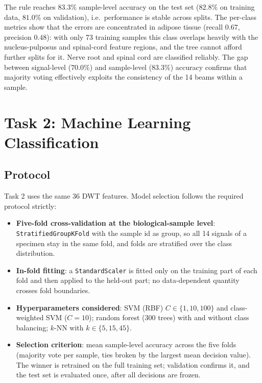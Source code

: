 \documentclass[11pt]{article}
\begin{document}
The rule reaches $83.3\%$ sample-level accuracy on the test set ($82.8\%$ on
training data, $81.0\%$ on validation), i.e.\ performance is stable across
splits. The per-class metrics show that the errors are concentrated in adipose
tissue (recall $0.67$, precision $0.48$): with only 73 training samples this
class overlaps heavily with the nucleus-pulposus and spinal-cord feature
regions, and the tree cannot afford further splits for it. Nerve root and
spinal cord are classified reliably. The gap between signal-level
($70.0\%$) and sample-level ($83.3\%$) accuracy confirms that majority voting
effectively exploits the consistency of the 14 beams within a sample.

\section{Task 2: Machine Learning Classification}

\subsection{Protocol}

Task 2 uses the same 36 DWT features. Model selection follows the required
protocol strictly:
\begin{itemize}[leftmargin=1.4em,itemsep=1pt]
    \item \textbf{Five-fold cross-validation at the biological-sample level}:
        \texttt{StratifiedGroupKFold} with the sample id as group, so all 14
        signals of a specimen stay in the same fold, and folds are stratified
        over the class distribution.
    \item \textbf{In-fold fitting}: a \texttt{StandardScaler} is fitted only on
        the training part of each fold and then applied to the held-out part;
        no data-dependent quantity crosses fold boundaries.
    \item \textbf{Hyperparameters considered}: SVM (RBF) $C \in \{1, 10, 100\}$
        and class-weighted SVM ($C=10$); random forest (300 trees) with and
        without class balancing; $k$-NN with $k \in \{5, 15, 45\}$.
    \item \textbf{Selection criterion}: mean sample-level accuracy across the
        five folds (majority vote per sample, ties broken by the largest mean
        decision value). The winner is retrained on the full training set;
        validation confirms it, and the test set is evaluated once, after all
        decisions are frozen.
\end{itemize}
\end{document}
